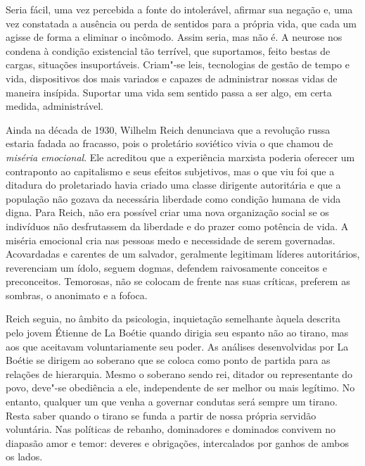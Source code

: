 Seria fácil, uma vez percebida a fonte do intolerável, afirmar sua
negação e, uma vez constatada a ausência ou perda de sentidos para a
própria vida, que cada um agisse de forma a eliminar o incômodo. Assim
seria, mas não é. A neurose nos condena à condição existencial tão
terrível, que suportamos, feito bestas de cargas, situações
insuportáveis. Criam"-se leis, tecnologias de gestão de tempo e vida,
dispositivos dos mais variados e capazes de administrar nossas vidas de
maneira insípida. Suportar uma vida sem sentido passa a ser algo, em
certa medida, administrável.

Ainda na década de 1930, Wilhelm Reich denunciava que a revolução russa
estaria fadada ao fracasso, pois o proletário soviético vivia o que
chamou de \emph{miséria emocional}. Ele acreditou que a experiência
marxista poderia oferecer um contraponto ao capitalismo e seus efeitos
subjetivos, mas o que viu foi que a ditadura do proletariado havia
criado uma classe dirigente autoritária e que a população não gozava da
necessária liberdade como condição humana de vida digna. Para Reich, não
era possível criar uma nova organização social se os indivíduos não
desfrutassem da liberdade e do prazer como potência de vida. A miséria
emocional cria nas pessoas medo e necessidade de serem governadas.
Acovardadas e carentes de um salvador, geralmente legitimam líderes
autoritários, reverenciam um ídolo, seguem dogmas, defendem raivosamente
conceitos e preconceitos. Temorosas, não se colocam de frente nas suas
críticas, preferem as sombras, o anonimato e a fofoca.

Reich seguia, no âmbito da psicologia, inquietação semelhante àquela
descrita pelo jovem Étienne de La Boétie quando dirigia seu espanto não
ao tirano, mas aos que aceitavam voluntariamente seu poder. As análises
desenvolvidas por La Boétie se dirigem ao soberano que se coloca como
ponto de partida para as relações de hierarquia. Mesmo o soberano sendo
rei, ditador ou representante do povo, deve"-se obediência a ele,
independente de ser melhor ou mais legítimo. No entanto, qualquer um que
venha a governar condutas será sempre um tirano. Resta saber quando o
tirano se funda a partir de nossa própria servidão voluntária. Nas
políticas de rebanho, dominadores e dominados convivem no diapasão amor
e temor: deveres e obrigações, intercalados por ganhos de ambos os
lados.

